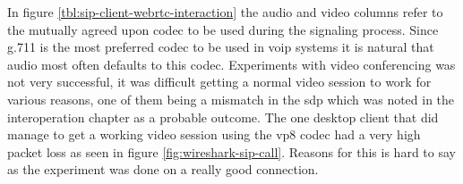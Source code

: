 \begin{table}[h]
\caption{SIP desktop client interaction with web client using proxy and RTCWEB}
\label{tbl:sip-client-webrtc-interaction}
\end{table}

In figure \ref{tbl:sip-client-webrtc-interaction} the audio and video columns refer to the mutually agreed upon codec to be used during the signaling process. Since g.711 is the most preferred codec to be used in \gls{voip} systems it is natural that audio most often defaults to this codec. Experiments with video conferencing was not very successful, it was difficult getting a normal video session to work for various reasons, one of them being a mismatch in the \gls{sdp} which was noted in the interoperation chapter as a probable outcome. The one desktop client that did manage to get a working video session using the vp8 codec had a very high packet loss as seen in figure \ref{fig:wireshark-sip-call}. Reasons for this is hard to say as the experiment was done on a really good connection.

